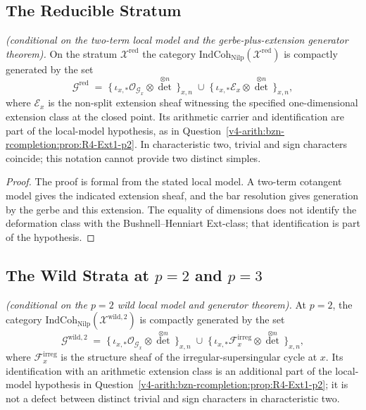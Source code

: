 \subsection{The Reducible Stratum}

\begin{proposition}
\label{v4-arith:w5-g:f1a3-C:prop:compact-gen-red}
\ClaimStatusProvedHereConditional \emph{(conditional on the two-term
local model and the gerbe-plus-extension generator theorem).} On the
stratum \(\mathcal{X}^{\mathrm{red}}\)
the category \(\mathrm{IndCoh}_{\mathrm{Nilp}}(\mathcal{X}^{\mathrm{red}})\)
is compactly generated by the set
\[
\mathcal{G}^{\mathrm{red}}
\;=\;\bigl\{\,\iota_{x,*}\mathcal{O}_{\mathcal{G}_{x}}\otimes\det^{\otimes n}\,\bigr\}_{x,n}
\;\cup\;\bigl\{\,\iota_{x,*}\mathcal{E}_{x}\otimes\det^{\otimes n}\,\bigr\}_{x,n},
\]
where \(\mathcal{E}_{x}\) is the non-split extension sheaf witnessing the
specified one-dimensional extension class at the closed point.
Its arithmetic carrier and identification are part of the local-model
hypothesis, as in
Question~\ref{v4-arith:bzn-rcompletion:prop:R4-Ext1-p2}.
In characteristic two, trivial and sign characters coincide; this
notation cannot provide two distinct simples.
\end{proposition}

\begin{proof}
The proof is formal from the stated local model. A two-term cotangent
model gives the indicated extension sheaf, and the bar resolution gives
generation by the gerbe and this extension. The equality of dimensions
does not identify the deformation class with the Bushnell--Henniart
Ext-class; that identification is part of the hypothesis.
\end{proof}

\subsection{The Wild Strata at \(p=2\) and \(p=3\)}

\begin{proposition}[compact generator on the wild stratum at \(p=2\)]
\label{v4-arith:w5-g:f1a3-C:prop:compact-gen-wild-p2}
\ClaimStatusProvedHereConditional \emph{(conditional on the \(p=2\)
wild local model and generator theorem).} At \(p=2\), the category
\(\mathrm{IndCoh}_{\mathrm{Nilp}}(\mathcal{X}^{\mathrm{wild},2})\) is
compactly generated by the set
\[
\mathcal{G}^{\mathrm{wild},2}
\;=\;\bigl\{\,\iota_{x,*}\mathcal{O}_{\mathcal{G}_{x}}\otimes\det^{\otimes n}\,\bigr\}_{x,n}
\;\cup\;\bigl\{\,\iota_{x,*}\mathcal{F}^{\mathrm{irreg}}_{x}\otimes\det^{\otimes n}\,\bigr\}_{x,n},
\]
where \(\mathcal{F}^{\mathrm{irreg}}_{x}\) is the structure sheaf of the
irregular-supersingular cycle at \(x\). Its identification with an
arithmetic extension class is an additional part of the local-model
hypothesis in Question~\ref{v4-arith:bzn-rcompletion:prop:R4-Ext1-p2};
it is not a defect between distinct trivial and sign characters in
characteristic two.
\end{proposition}

